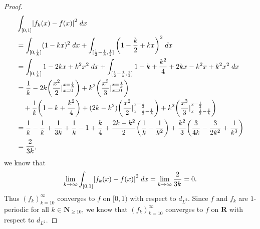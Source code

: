\begin{proof}
\begin{align*}
         & \int_{[0, 1]} \abs*{f_k(x) - f(x)}^2 \; dx                                                                                                                                                                                         \\
         & = \int_{[0, \frac{1}{k}]} (1 - kx)^2 \; dx + \int_{[\frac{1}{2} - \frac{1}{k}, \frac{1}{2}]} \bigg(1 - \frac{k}{2} + kx\bigg)^2 \; dx                                                                                              \\
         & = \int_{[0, \frac{1}{k}]} 1 - 2kx + k^2 x^2 \; dx + \int_{[\frac{1}{2} - \frac{1}{k}, \frac{1}{2}]} 1 - k + \frac{k^2}{4} + 2kx - k^2 x + k^2 x^2 \; dx                                                                            \\
         & = \frac{1}{k} - 2k \bigg(\frac{x^2}{2}|_{x = 0}^{x = \frac{1}{k}}\bigg) + k^2 \bigg(\frac{x^3}{3}|_{x = 0}^{x = \frac{1}{k}}\bigg)                                                                                                 \\
         & \quad + \frac{1}{k} \bigg(1 - k + \frac{k^2}{4}\bigg) + (2k - k^2) \bigg(\frac{x^2}{2}|_{x = \frac{1}{2} - \frac{1}{k}}^{x = \frac{1}{2}}\bigg) + k^2 \bigg(\frac{x^3}{3}|_{x = \frac{1}{2} - \frac{1}{k}}^{x = \frac{1}{2}}\bigg) \\
         & = \frac{1}{k} - \frac{1}{k} + \frac{1}{3k} + \frac{1}{k} - 1 + \frac{k}{4} + \frac{2k - k^2}{2} \bigg(\frac{1}{k} - \frac{1}{k^2}\bigg) + \frac{k^2}{3} \bigg(\frac{3}{4k} - \frac{3}{2k^2} + \frac{1}{k^3}\bigg)                  \\
         & = \frac{2}{3k},
    \end{align*}
    we know that
    \[
        \lim_{k \to \infty} \int_{[0, 1]} \abs*{f_k(x) - f(x)}^2 \; dx = \lim_{k \to \infty} \frac{2}{3k} = 0.
    \]
    Thus \((f_k)_{k = 10}^\infty\) converges to \(f\) on \([0, 1)\) with respect to \(d_{L^2}\).
    Since \(f\) and \(f_k\) are \(1\)-periodic for all \(k \in \mathbf{N}_{\geq 10}\), we know that \((f_k)_{k = 10}^\infty\) converges to \(f\) on \(\mathbf{R}\) with respect to \(d_{L^2}\).
\end{proof}


